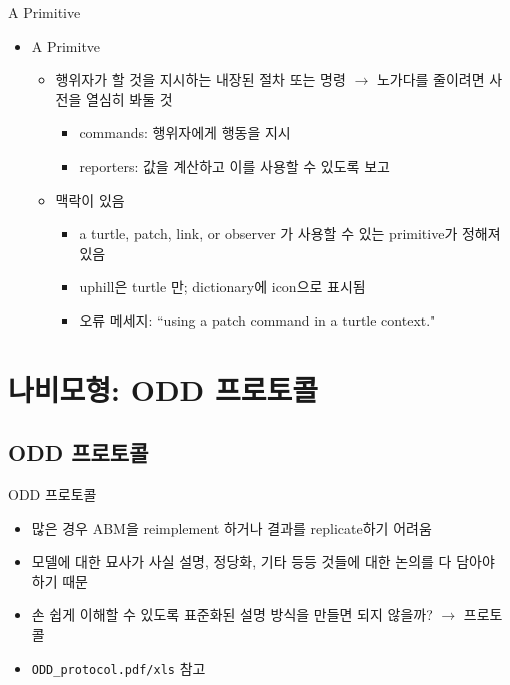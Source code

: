 \documentclass[hyperref={unicode}]{beamer}
\begin{document}
\begin{frame}{A Primitive}
\begin{itemize}
\item A Primitve
	\begin{itemize}
	\item 행위자가 할 것을 지시하는 내장된 절차 또는 명령 $\rightarrow$ 노가다를 줄이려면 사전을 열심히 봐둘 것
		\begin{itemize}
		\item commands: 행위자에게 행동을 지시
		\item reporters: 값을 계산하고 이를 사용할 수 있도록 보고 
		\end{itemize}	
	\item 맥락이 있음
		\begin{itemize}
		\item a turtle, patch, link, or observer 가 사용할 수 있는 primitive가 정해져 있음 
		\item uphill은 turtle 만; dictionary에 icon으로 표시됨
		\item 오류 메세지: ``using a patch command in a turtle context."
		\end{itemize}
	\end{itemize}
\end{itemize}	
\end{frame}

\section{나비모형: ODD 프로토콜}
\subsection*{ODD 프로토콜}
\begin{frame}[fragile]{ODD 프로토콜}
\begin{itemize}
\item 많은 경우 ABM을 reimplement 하거나 결과를 replicate하기 어려움
\item 모델에 대한 묘사가 사실 설명, 정당화, 기타 등등 것들에 대한 논의를 다 담아야 하기 때문
\item 손 쉽게 이해할 수 있도록 표준화된 설명 방식을 만들면 되지 않을까? $\rightarrow$ 프로토콜
\item \verb|ODD_protocol.pdf/xls| 참고 
\end{itemize}	
\end{frame}
\end{document}
